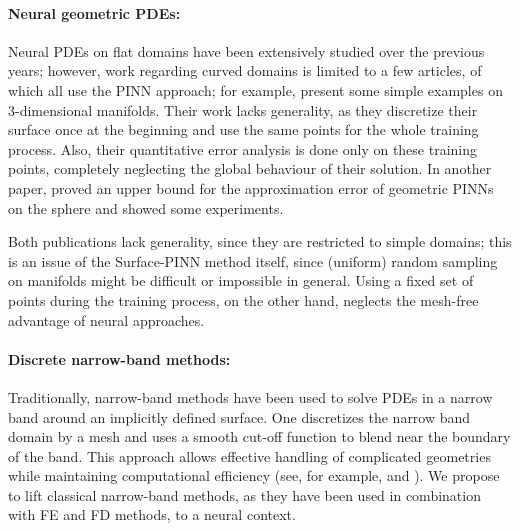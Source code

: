 \documentclass[12pt,openany]{book}
\theoremstyle{plainnormal}
\theoremstyle{remark}
\begin{document}
\paragraph{Neural geometric PDEs:}
Neural PDEs on flat domains have been extensively studied over the previous years; however, work regarding curved domains is limited to a few articles, of which all use the PINN approach; for example, \cite{tangfu} present some simple examples on 3-dimensional manifolds. Their work lacks generality, as they discretize their surface once at the beginning and use the same points for the whole training process. Also, their quantitative error analysis is done only on these training points, completely neglecting the global behaviour of their solution. In another paper, \cite{lei2024solvingpdesspheresphysicsinformed} proved an upper bound for the approximation error of geometric PINNs on the sphere and showed some experiments.\par
Both publications lack generality, since they are restricted to simple domains; this is an issue of the Surface-PINN method itself, since (uniform) random sampling on manifolds might be difficult or impossible in general. Using a fixed set of points during the training process, on the other hand, neglects the mesh-free advantage of neural approaches. 
\paragraph{Discrete narrow-band methods:}
Traditionally, narrow-band methods have been used to solve PDEs in a narrow band around an implicitly defined surface. One discretizes the narrow band domain by a mesh and uses a smooth cut-off function to blend near the boundary of the band. This approach allows effective handling of complicated geometries while maintaining computational efficiency (see, for example, \cite{deckelnick} and \cite{neRU}). We propose to lift classical narrow-band methods, as they have been used in combination with FE and FD methods, to a neural context. 
\end{document}
